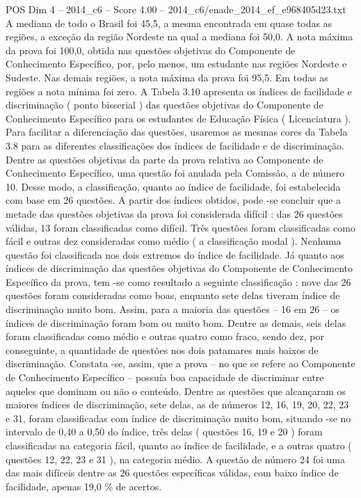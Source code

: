 \begin{textsample}{POS Dim 4 – 2014\_c6 – Score 4.00 – 2014\_c6/enade\_2014\_ef\_e968405d23.txt}
A mediana de todo o Brasil foi 45,5, a mesma encontrada em quase todas as regiões, a exceção da região Nordeste na qual a mediana foi 50,0.
A nota máxima da prova foi 100,0, obtida nas questões objetivas do Componente de Conhecimento Específico, por, pelo menos, um estudante nas regiões Nordeste e Sudeste.
Nas demais regiões, a nota máxima da prova foi 95,5.
Em todas as regiões a nota mínima foi zero.
A Tabela 3.10 apresenta os índices de facilidade e discriminação ( ponto bisserial ) das questões objetivas do Componente de Conhecimento Específico para os estudantes de Educação Física ( Licenciatura ).
Para facilitar a diferenciação das questões, usaremos as mesmas cores da Tabela 3.8 para as diferentes classificações dos índices de facilidade e de discriminação.
Dentre as questões objetivas da parte da prova relativa ao Componente de Conhecimento Específico, uma questão foi anulada pela Comissão, a de número 10.
Desse modo, a classificação, quanto ao índice de facilidade, foi estabelecida com base em 26 questões.
A partir dos índices obtidos, pode -se concluir que a metade das questões objetivas da prova foi considerada difícil : das 26 questões válidas, 13 foram classificadas como difícil.
Três questões foram classificadas como fácil e outras dez consideradas como médio ( a classificação modal ).
Nenhuma questão foi classificada nos dois extremos do índice de facilidade.
Já quanto aos índices de discriminação das questões objetivas do Componente de Conhecimento Específico da prova, tem -se como resultado a seguinte classificação : nove das 26 questões foram consideradas como boas, enquanto sete delas tiveram índice de discriminação muito bom.
Assim, para a maioria das questões – 16 em 26 – os índices de discriminação foram bom ou muito bom.
Dentre as demais, seis delas foram classificadas como médio e outras quatro como fraco, sendo dez, por conseguinte, a quantidade de questões nos dois patamares mais baixos de discriminação.
Constata -se, assim, que a prova – no que se refere ao Componente de Conhecimento Específico – possuía boa capacidade de discriminar entre aqueles que dominam ou não o conteúdo.
Dentre as questões que alcançaram os maiores índices de discriminação, sete delas, as de números 12, 16, 19, 20, 22, 23 e 31, foram classificadas com índice de discriminação muito bom, situando -se no intervalo de 0,40 a 0,50 do índice, três delas ( questões 16, 19 e 20 ) foram classificadas na categoria fácil, quanto ao índice de facilidade, e a outras quatro ( questões 12, 22, 23 e 31 ), na categoria médio.
A questão de número 24 foi uma das mais difíceis dentre as 26 questões específicas válidas, com baixo índice de facilidade, apenas 19,0 \% de acertos.

\end{textsample}
